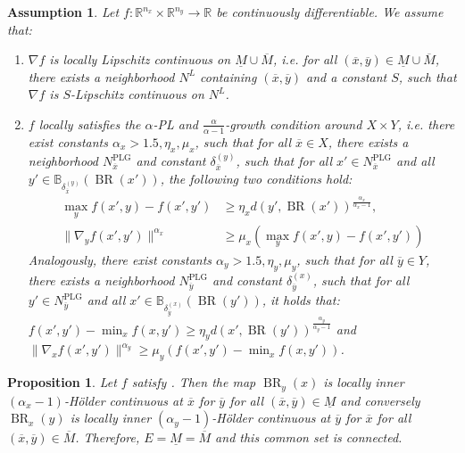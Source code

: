 \documentclass{article}
\newtheorem{assum}{Assumption}
\newtheorem{prop}{Proposition}
\newcommand{\R}{\mathbb{R}}
\newcommand{\B}{\mathbb{B}}
\DeclareMathOperator{\BR}{BR}
\begin{document}
\begin{assum}
   \label{assum:localPL}
    Let $f: \R^{n_x}\times \R^{n_y}\to \R$ be continuously differentiable.
    We assume that:
    \begin{enumerate}
      
        \item $\nabla f$ is locally Lipschitz continuous on $\underline{M}\cup\overline{M}$, i.e. for all $(\overline{x},\overline{y})\in \underline{M}\cup \overline{M}$, there exists a neighborhood $N^L$ containing $(\overline{x},\overline{y})$ and a constant $S$, such that $\nabla f$ is $S$-Lipschitz continuous on $N^L$.
        \item $f$ locally satisfies the $\alpha$-PL and $\frac{\alpha}{\alpha-1}$-growth condition around $X\times Y$, i.e. there exist constants $\alpha_x>1.5,\eta_x,\mu_x$, such that for all $\overline{x}\in X$, there exists a neighborhood $N_{\overline{x}}^\text{PLG}$ and constant $\delta_{\overline{x}}^{(y)}$, such that for all $x' \in N_{\overline{x}}^\text{PLG}$ and all $y' \in \B_{\delta_{\overline{x}}^{(y)}}(\BR(x'))$, the following two conditions hold:
        \begin{align*}
            \max_{y} f(x',y) - f(x',y') &\geq \eta_x d(y',\BR(x'))^{\frac{\alpha_x}{\alpha_x-1}},\\
            \|\nabla_y f(x',y')\|^{\alpha_x} &\geq \mu_x \left( \max_{y} f(x',y) - f(x',y')\right)
        \end{align*}
        Analogously, there exist constants $\alpha_y>1.5,\eta_y,\mu_y$, such that for all $\overline{y}\in Y$, there exists a neighborhood $N_{\overline{y}}^\text{PLG}$ and constant $\delta_{\overline{y}}^{(x)}$, such that for all $y' \in N_{\overline{y}}^\text{PLG}$ and all $x' \in \B_{\delta_{\overline{y}}^{(x)}}(\BR(y'))$, it holds that:\(
            f(x',y') - \min_{x} f(x,y') \geq \eta_y d(x',\BR(y'))^{\frac{\alpha_y}{\alpha_y-1}}\) and 
           \( \|\nabla_x f(x',y')\|^{\alpha_y} \geq \mu_y \left( f(x',y') - \min_{x} f(x,y')\right)\).

    \end{enumerate}
\end{assum}


\begin{prop}
    \label{prop:localPLconnected}
    Let $f$ satisfy . Then the map $\BR_y(x)$ is locally inner $(\alpha_x-1)$-Hölder continuous at $\overline{x}$ for $\overline{y}$ for all $(\overline{x},\overline{y})\in \underline{M}$ and conversely $\BR_x(y)$ is locally inner $(\alpha_y-1)$-Hölder continuous at $\overline{y}$ for $\overline{x}$ for all $(\overline{x},\overline{y})\in \overline{M}$. Therefore, $E=\underline{M}=\overline{M}$ and this common set is connected.
\end{prop}
\end{document}
